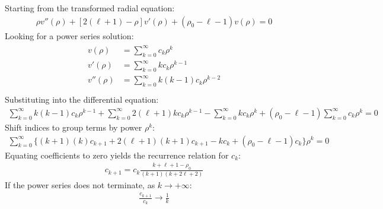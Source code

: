 \documentclass[letterpaper,10pt,english]{jupyterBook}
\begin{document}
\sphinxAtStartPar
Starting from the transformed radial equation:
\begin{equation*}
\begin{split}\rho v''(\rho) + [2(\ell + 1) - \rho] v'(\rho) + (\rho_0 - \ell - 1) v(\rho) = 0\end{split}
\end{equation*}
\sphinxAtStartPar
Looking for a power series solution:
\begin{equation*}
\begin{split}\begin{aligned}
    v(\rho) & = \sum_{k=0}^{\infty} c_k \rho^k  \\
   v'(\rho) & = \sum_{k=0}^{\infty} k c_k \rho^{k-1} \\
  v''(\rho) & = \sum_{k=0}^{\infty} k(k-1) c_k \rho^{k-2} \\
\end{aligned}\end{split}
\end{equation*}
\sphinxAtStartPar
Substituting into the differential equation:
\begin{equation*}
\begin{split}\sum_{k=0}^{\infty} k(k-1) c_k \rho^{k-1} + \sum_{k=0}^{\infty} 2(\ell + 1) k c_k \rho^{k-1} - \sum_{k=0}^{\infty} k c_k \rho^k + (\rho_0 - \ell - 1) \sum_{k=0}^{\infty} c_k \rho^k = 0\end{split}
\end{equation*}
\sphinxAtStartPar
Shift indices to group terms by power \(\rho^k\):
\begin{equation*}
\begin{split}\sum_{k=0}^{\infty} \Big\{ (k+1)(k) c_{k+1} + 2(\ell + 1)(k+1) c_{k+1} - k c_k + (\rho_0 - \ell - 1) c_k \Big\} \rho^k = 0\end{split}
\end{equation*}
\sphinxAtStartPar
{} Equating coefficients to zero yields the recurrence relation for \(c_k\):
\begin{equation*}
\begin{split}c_{k+1} = c_k \frac{k + \ell + 1 - \rho_0}{(k + 1)(k + 2\ell + 2)}\end{split}
\end{equation*}
\sphinxAtStartPar
{} If the power series does not terminate, as \(k \to +\infty\):
\begin{equation*}
\begin{split}\frac{c_{k+1}}{c_k} \longrightarrow \frac{1}{k}\end{split}
\end{equation*}
\end{document}
